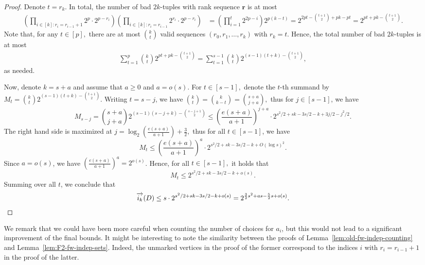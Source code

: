 \documentclass{article}
\theoremstyle{plain}
\theoremstyle{definition}
\newcommand{\br}{\mathbf{r}}
\newcommand{\fwi}[1]{\overrightarrow{i_{#1}}}
\begin{document}
\begin{proof}
    Denote $t = r_k$. In total, the number of bad $2k$-tuples with rank sequence $\br$ is at most
    \begin{align*}
        \left( \prod_{i \in [k] \colon r_i = r_{i-1} + 1} 2^p \cdot 2^{p - r_i}\right) \left( \prod_{i \in [k] \colon r_i = r_{i-1}} 2^{r_i} \cdot 2^{p - r_i} \right) &= \left(\prod_{i=1}^t 2^{2p - i}\right) 2^{p(k - t)} = 2^{2p t - \binom{t + 1}{2} + pk - pt} = 2^{pt + pk - \binom{t+1}{2}}.
    \end{align*}
    Note that, for any $t \in [p],$ there are at most $\binom{k}{t}$ valid sequences $(r_0, r_1, \dots, r_k)$ with $r_k = t$. Hence, the total number of bad $2k$-tuples is at most
    \begin{align*}
        \sum_{t=1}^p \binom{k}{t} 2^{pt + pk - \binom{t+1}{2}} = \sum_{t=1}^{s-1} \binom{k}{t} 2^{(s-1)(t+k) - \binom{t+1}{2}},
    \end{align*}
    as needed.

    Now, denote $k = s+a$ and assume that $a \ge 0$ and $a = o(s)$. For $t \in [s-1],$ denote the $t$-th summand by $M_t = \binom{k}{t} 2^{(s-1)(t+k) - \binom{t+1}{2}}$. Writing $t = s - j$, we have $\binom{k}{t} = \binom{k}{k-t} = \binom{s+a}{j+a},$ thus for $j \in [s-1]$, we have 
    \[ M_{s-j} = \binom{s+a}{j+a} 2^{(s-1)(s-j+k) - \binom{s-j+1}{2}} \le \left(\frac{e(s+a)}{a+1}\right)^{j+a} \cdot 2^{s^2/2 + sk - 3s/2 - k + 3j/2 - j^2/2}. \]
    The right hand side is maximized at $j = \log_2\left( 
    \frac{e(s+a)}{a+1} \right) + \frac{3}{2},$ thus for all $t \in [s-1]$, we have
    \[ M_t \le \left(\frac{e(s+a)}{a+1}\right)^a \cdot 2^{s^2/2 + sk - 3s/2 - k + O(\log s)^2}. \]
    Since $a = o(s)$, we have $\left(\frac{e(s+a)}{a+1}\right)^a = 2^{o(s)}$. Hence, for all $t \in [s-1],$ it holds that
    \[ M_t \le 2^{s^2/2 + sk - 3s/2 - k + o(s)}. \]
    Summing over all $t$, we conclude that 
    \begin{equation*}
        \fwi{k}(D) \le s \cdot 2^{s^2/2 + sk - 3s/2 - k + o(s)} = 2^{\frac{3}{2}s^2 + as - \frac{5}{2}s + o(s)}. \qedhere
    \end{equation*}
\end{proof}
We remark that we could have been more careful when counting the number of choices for $a_i$, but this would not lead to a significant improvement of the final bounds. It might be interesting to note the similarity between the proofs of Lemma~\ref{lem:old-fw-indep-counting} and Lemma~\ref{lem:F2-fw-indep-sets}. Indeed, the unmarked vertices in the proof of the former correspond to the indices $i$ with $r_i = r_{i-1} + 1$ in the proof of the latter.
\end{document}
